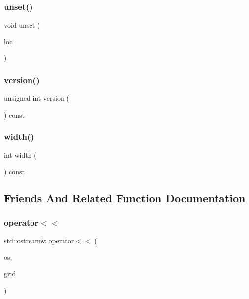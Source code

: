 \subsubsection{\texorpdfstring{unset()}{unset()}\hspace{0.1cm}{\footnotesize\ttfamily [2/2]}}
{\footnotesize\ttfamily void unset (\begin{DoxyParamCaption}\item[{const \mbox{\hyperlink{structGridLocation}{Grid\+Location}} \&}]{loc }\end{DoxyParamCaption})}

\mbox{\label{classSparseGrid_a0aa696ccb72cbf928535d6b646bac1aa}} 
\subsubsection{\texorpdfstring{version()}{version()}}
{\footnotesize\ttfamily unsigned int version (\begin{DoxyParamCaption}{ }\end{DoxyParamCaption}) const}

\mbox{\label{classSparseGrid_ad72663daf610f2a0833a2fc3d78e4fdf}} 
\subsubsection{\texorpdfstring{width()}{width()}}
{\footnotesize\ttfamily int width (\begin{DoxyParamCaption}{ }\end{DoxyParamCaption}) const}



\subsection{Friends And Related Function Documentation}
\mbox{\label{classSparseGrid_a9fbe60d6b428febe772a67368dc1ca64}} 
\subsubsection{\texorpdfstring{operator$<$$<$}{operator<<}}
{\footnotesize\ttfamily std\+::ostream\& operator$<$$<$ (\begin{DoxyParamCaption}\item[{std\+::ostream \&}]{os,  }\item[{const \mbox{\hyperlink{classSparseGrid}{Sparse\+Grid}}$<$ T $>$ \&}]{grid }\end{DoxyParamCaption})\hspace{0.3cm}{\ttfamily [friend]}}

